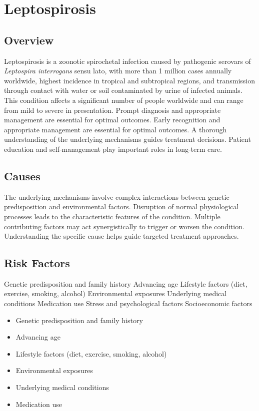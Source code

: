 \chapter{Leptospirosis}
\label{sec:Leptospirosis}

\section{Overview}
Leptospirosis is a zoonotic spirochetal infection caused by pathogenic serovars of \textit{Leptospira interrogans} sensu lato, with more than 1 million cases annually worldwide, highest incidence in tropical and subtropical regions, and transmission through contact with water or soil contaminated by urine of infected animals. This condition affects a significant number of people worldwide and can range from mild to severe in presentation. Prompt diagnosis and appropriate management are essential for optimal outcomes. Early recognition and appropriate management are essential for optimal outcomes. A thorough understanding of the underlying mechanisms guides treatment decisions. Patient education and self-management play important roles in long-term care.
\section{Causes}
The underlying mechanisms involve complex interactions between genetic predisposition and environmental factors. Disruption of normal physiological processes leads to the characteristic features of the condition. Multiple contributing factors may act synergistically to trigger or worsen the condition. Understanding the specific cause helps guide targeted treatment approaches.
\section{Risk Factors}
Genetic predisposition and family history Advancing age Lifestyle factors (diet, exercise, smoking, alcohol) Environmental exposures Underlying medical conditions Medication use Stress and psychological factors Socioeconomic factors

\begin{itemize}[noitemsep]
  \item Genetic predisposition and family history
  \item Advancing age
  \item Lifestyle factors (diet, exercise, smoking, alcohol)
  \item Environmental exposures
  \item Underlying medical conditions
  \item Medication use
\end{itemize}

